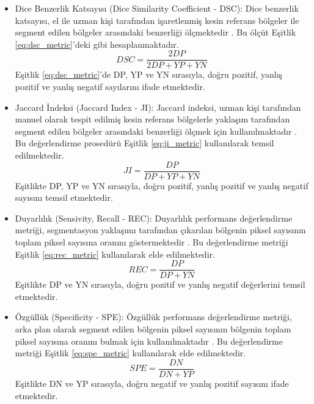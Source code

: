 \begin{itemize}
	\item Dice Benzerlik Katsayısı (Dice Similarity Coefficient - DSC): Dice benzerlik katsayısı, el ile uzman kişi tarafından işaretlenmiş kesin referans bölgeler ile segment edilen bölgeler arasındaki benzerliği ölçmektedir \cite{dice1945measures}. Bu ölçüt Eşitlik \ref{eq:dsc_metric}’deki gibi hesaplanmaktadır.
	{\setlength{\mathindent}{0cm}
	\begin{equation}    
		\label{eq:dsc_metric}
		DSC=\frac{2 DP}{2 DP+YP+YN}
	\end{equation}}
	Eşitlik \ref{eq:dsc_metric}’de DP, YP ve YN sırasıyla, doğru pozitif, yanlış pozitif ve yanlış negatif sayılarını ifade etmektedir.
	
	\item Jaccard İndeksi (Jaccard Index - JI): Jaccard indeksi, uzman kişi tarafından manuel olarak tespit edilmiş kesin referans bölgelerle yaklaşım tarafından segment edilen bölgeler arasındaki benzerliği ölçmek için kullanılmaktadır \cite{jaccard1912distribution}. Bu değerlendirme prosedürü Eşitlik \ref{eq:ji_metric} kullanılarak temsil edilmektedir. 
	{\setlength{\mathindent}{0cm}
	\begin{equation}
		\label{eq:ji_metric}
		JI=\frac{DP}{DP+YP+YN}
	\end{equation}}
	Eşitlikte DP, YP ve YN sırasıyla, doğru pozitif, yanlış pozitif ve yanlış negatif sayısını temsil etmektedir. 
	
	\item Duyarlılık (Sensivity, Recall - REC): Duyarlılık performans değerlendirme metriği, segmentasyon yaklaşımı tarafından çıkarılan bölgenin piksel sayısının toplam piksel sayısına oranını göstermektedir \cite{altman1994diagnostic}. Bu değerlendirme metriği Eşitlik \ref{eq:rec_metric} kullanılarak elde edilmektedir.
	{\setlength{\mathindent}{0cm}
	\begin{equation}
		\label{eq:rec_metric}
		REC=\frac{DP}{DP+YN}
	\end{equation}}
	Eşitlikte DP ve YN sırasıyla, doğru pozitif ve yanlış negatif değerlerini temsil etmektedir.
	
	\item Özgüllük (Specificity - SPE): Özgüllük performans değerlendirme metriği, arka plan olarak segment edilen bölgenin piksel sayısının bölgenin toplam piksel sayısına oranını bulmak için kullanılmaktadır \cite{altman1994diagnostic}. Bu değerlendirme metriği Eşitlik \ref{eq:spe_metric} kullanılarak elde edilmektedir.
	{\setlength{\mathindent}{0cm}
	\begin{equation}
		\label{eq:spe_metric}
		SPE=\frac{DN}{DN+YP}
	\end{equation}}
	Eşitlikte DN ve YP sırasıyla, doğru negatif ve yanlış pozitif sayısını ifade etmektedir.
	

\end{itemize}
